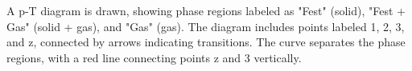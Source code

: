 A p-T diagram is drawn, showing phase regions labeled as "Fest" (solid), "Fest + Gas" (solid + gas), and "Gas" (gas). The diagram includes points labeled 1, 2, 3, and z, connected by arrows indicating transitions. The curve separates the phase regions, with a red line connecting points z and 3 vertically.